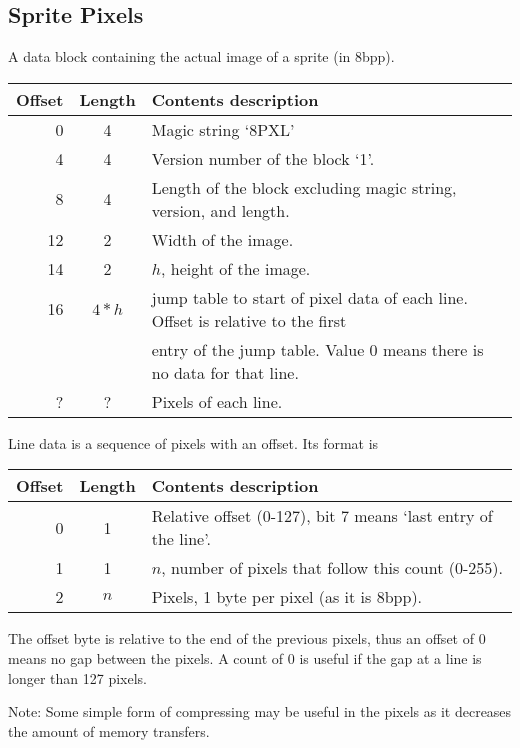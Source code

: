 \documentclass{article}
\begin{document}
\subsection{Sprite Pixels}
A data block containing the actual image of a sprite (in 8bpp).

\begin{center}
\begin{tabular}{|r|c|l|} \hline
\textbf{Offset} & \textbf{Length} & \textbf{Contents description} \\ \hline
 0 & 4 & Magic string `8PXL' \\
 4 & 4 & Version number of the block `1'. \\
 8 & 4 & Length of the block excluding magic string, version, and length. \\
12 & 2 & Width of the image. \\
14 & 2 & $h$, height of the image. \\
16 & $4*h$ & jump table to start of pixel data of each line. Offset is relative to the first \\
   &       & entry of the jump table. Value 0 means there is no data for that line. \\
 ? &    ?  & Pixels of each line. \\ \hline
\end{tabular}
\end{center}

Line data is a sequence of pixels with an offset. Its format is

\begin{center}
\begin{tabular}{|r|c|l|} \hline
\textbf{Offset} & \textbf{Length} & \textbf{Contents description} \\ \hline
 0 & 1 & Relative offset (0-127), bit 7 means `last entry of the line'. \\
 1 & 1 & $n$, number of pixels that follow this count (0-255). \\
 2 & $n$ & Pixels, 1 byte per pixel (as it is 8bpp). \\ \hline
\end{tabular}
\end{center}

The offset byte is relative to the end of the previous pixels, thus an offset
of 0 means no gap between the pixels. A count of 0 is useful if the gap at a
line is longer than 127 pixels.

\medskip
Note: Some simple form of compressing may be useful in the pixels as it
decreases the amount of memory transfers.
\end{document}
